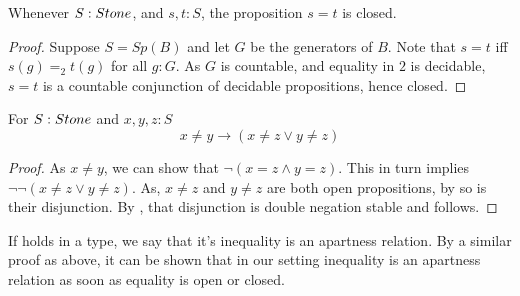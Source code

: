 \begin{lemma}\label{StoneEqualityClosed}
  Whenever $S:\Stone$, and $s,t:S$, the proposition $s=t$ is closed. 
\end{lemma}
\begin{proof}
  Suppose $S= Sp(B)$ and let $G$ be the generators of $B$. 
  Note that $s=t$ iff $s(g) =_2 t(g)$ for all $g:G$. 
  As $G$ is countable, and equality in $2$ is decidable, 
  $s=t$ is a countable conjunction of decidable propositions, hence 
  closed. 
\end{proof}
%
\begin{corollary}\label{StoneEqualityApartness}
  For $S:\Stone$ and $x,y,z:S$ 
  \begin{equation}\label{Apartness}
  x \neq y \to (x\neq z \vee y \neq z)
  \end{equation}
\end{corollary}
\begin{proof}
  As $x\neq y$, we can show that $\neg ( x = z \wedge y = z)$. 
  This in turn implies $\neg \neg ( x \neq  z \vee y \neq  z)$. 
  As, $x\neq z$ and $y \neq z$ are both open propositions, by  so is their disjunction. 
  By , that disjunction is double negation stable and  follows. 
\end{proof}
\begin{remark}
  If  holds in a type, we say that it's inequality is an apartness relation. 
  By a similar proof as above, it can be shown that in our setting inequality is an apartness relation 
  as soon as equality is open or closed. 
\end{remark}
